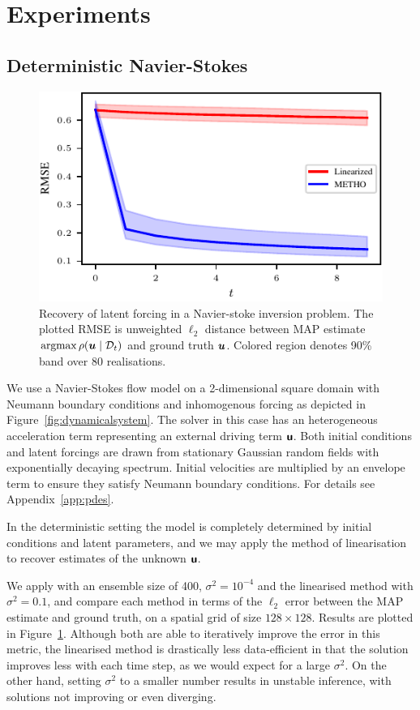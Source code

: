 \section{Experiments}


\subsection{Deterministic Navier-Stokes}
\begin{figure}[h!t]
    \centering
    \includegraphics[scale=1]{linear_vs_metho_large.pdf}
    \centering
    \caption{Recovery of latent forcing in a Navier-stoke inversion problem. The plotted RMSE is unweighted \(\ell_2\) distance between MAP estimate \(\operatorname{arg max} \rho(\boldsymbol{u} \mid \mathcal{D}_t)\) and ground truth \(\boldsymbol{u}\). Colored region denotes 90\% band over 80 realisations.}
    \label{fig:linear_vs_metho}
\end{figure}

We use a Navier-Stokes flow model on a 2-dimensional square domain with Neumann boundary conditions and inhomogenous forcing as depicted in Figure~\ref{fig:dynamicalsystem}.
The solver in this case has an heterogeneous acceleration term representing an external driving term \(\boldsymbol{\mathsf{\boldsymbol{\mathsf{u}}}}\).
Both initial conditions and latent forcings are drawn from stationary Gaussian random fields with exponentially decaying spectrum.
Initial velocities are multiplied by an envelope term to ensure they satisfy Neumann boundary conditions.
For details see Appendix~\ref{app:pdes}.

In the deterministic setting the model is completely determined by initial conditions and latent parameters, and we may apply the method of linearisation to recover estimates of the unknown \(\boldsymbol{\mathsf{\boldsymbol{\mathsf{u}}}}\).

We apply \meth{} with an ensemble size of 400, \(\sigma^2=10^{-4}\) and the linearised method with \(\sigma^2=0.1\), and compare each method in terms of the \(\ell_2\) error between the MAP estimate and ground truth, on a spatial grid of size \(128\times 128\).
Results are plotted in Figure~\ref{fig:linear_vs_metho}.
Although both are able to iteratively improve the error in this metric, the linearised method is drastically less data-efficient in that the solution improves less with each time step, as we would expect for a large \(\sigma^2\).
On the other hand, setting \(\sigma^2\) to a smaller number results in unstable inference, with solutions not improving or even diverging.

